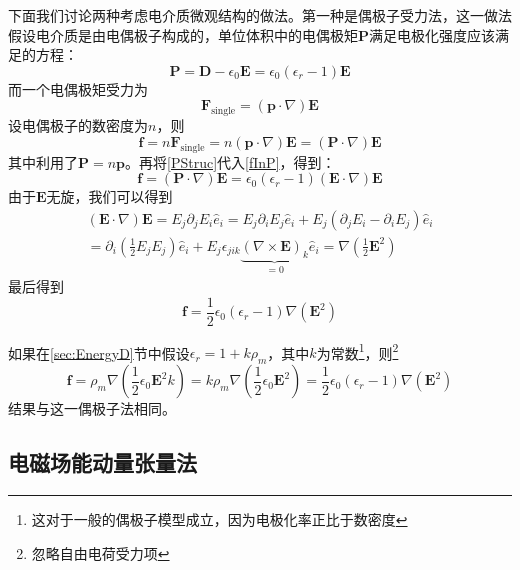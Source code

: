 \documentclass{ctexart}
\newcommand{\epsz}{\epsilon_0}
\newcommand{\epsr}{\epsilon_r}
\begin{document}
	下面我们讨论两种考虑电介质微观结构的做法。第一种是偶极子受力法，这一做法假设电介质是由电偶极子构成的，单位体积中的电偶极矩$\mathbf P$满足电极化强度应该满足的方程：
	\begin{equation}\label{PStruc}
	\mathbf P=\mathbf D-\epsilon_0\mathbf E=\epsilon_0(\epsr-1)\mathbf E
	\end{equation}
	而一个电偶极矩受力为
	\begin{equation}
	\mathbf F_{\text{single}}=(\mathbf p\cdot\nabla)\mathbf E
	\end{equation}
	设电偶极子的数密度为$n$，则
	\begin{equation}\label{fInP}
	\mathbf f=n\mathbf F_{\text{single}}=n(\mathbf p\cdot\nabla)\mathbf E=(\mathbf P\cdot\nabla)\mathbf E
	\end{equation}
	其中利用了$\mathbf P=n\mathbf p$。再将\eqref{PStruc}代入\eqref{fInP}，得到：
	\begin{equation}
	\mathbf f=(\mathbf P\cdot\nabla)\mathbf E=\epsz(\epsr-1)(\mathbf E\cdot\nabla)\mathbf E
	\end{equation}
	由于$\mathbf E$无旋，我们可以得到
	\begin{multline}\label{NoCurlId}
	(\mathbf E\cdot\nabla)\mathbf E=E_j\partial_j E_i\hat{e}_i=E_j\partial_i E_j\hat{e}_i+E_j(\partial_j E_i-\partial_i E_j)\hat{e}_i\\
	=\partial_i\left(\frac{1}{2}E_jE_j\right)\hat{e}_i+E_j\epsilon_{jik}\underbrace{(\nabla\times\mathbf E)_k}_{=0}\hat{e}_i=\nabla\left(\frac{1}{2}\mathbf E^2\right)
	\end{multline}
	最后得到
	\begin{equation}\label{DipoleForce}
	\mathbf f=\frac{1}{2}\epsz(\epsr-1)\nabla\left(\mathbf E^2\right)
	\end{equation}
	
	如果在\ref{sec:EnergyD}节中假设$\epsr=1+k\rho_m$，其中$k$为常数\footnote{这对于一般的偶极子模型成立，因为电极化率正比于数密度}，则\footnote{忽略自由电荷受力项}
	\begin{equation}
	\mathbf f=\rho_m\nabla\left(\frac{1}{2}\epsz\mathbf E^2k\right)=k\rho_m\nabla\left(\frac{1}{2}\epsz\mathbf E^2\right)=\frac{1}{2}\epsz(\epsr-1)\nabla\left(\mathbf E^2\right)
	\end{equation}
	结果与这一偶极子法相同。
	
	\subsection{电磁场能动量张量法}\label{sec:EMTensor}
	
\end{document}

